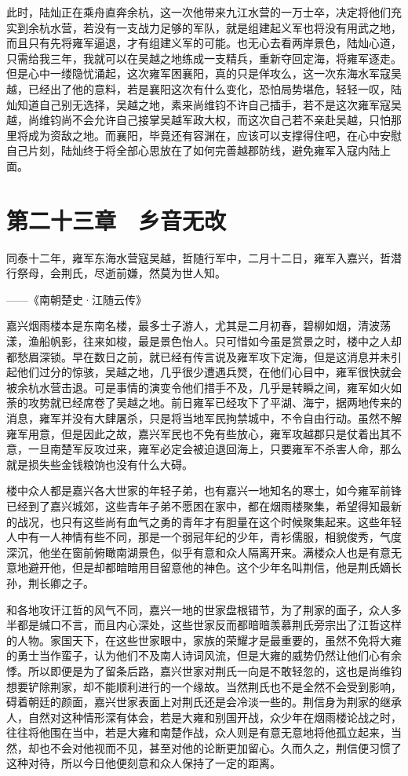 此时，陆灿正在乘舟直奔余杭，这一次他带来九江水营的一万士卒，决定将他们充实到余杭水营，若没有一支战力足够的军队，就是组建起义军也将没有用武之地，而且只有先将雍军逼退，才有组建义军的可能。也无心去看两岸景色，陆灿心道，只需给我三年，我就可以在吴越之地练成一支精兵，重新夺回定海，将雍军逐走。但是心中一缕隐忧涌起，这次雍军困襄阳，真的只是佯攻么，这一次东海水军寇吴越，已经出了他的意料，若是襄阳这次有什么变化，恐怕局势堪危，轻轻一叹，陆灿知道自己别无选择，吴越之地，素来尚维钧不许自己插手，若不是这次雍军寇吴越，尚维钧尚不会允许自己接掌吴越军政大权，而这次自己若不亲赴吴越，只怕那里将成为资敌之地。而襄阳，毕竟还有容渊在，应该可以支撑得住吧，在心中安慰自己片刻，陆灿终于将全部心思放在了如何完善越郡防线，避免雍军入寇内陆上面。

\chapter{第二十三章　乡音无改}

同泰十二年，雍军东海水营寇吴越，哲随行军中，二月十二日，雍军入嘉兴，哲潜行祭母，会荆氏，尽逝前嫌，然莫为世人知。

——《南朝楚史·江随云传》

嘉兴烟雨楼本是东南名楼，最多士子游人，尤其是二月初春，碧柳如烟，清波荡漾，渔船帆影，往来如梭，最是景色怡人。只可惜如今虽是赏景之时，楼中之人却都愁眉深锁。早在数日之前，就已经有传言说及雍军攻下定海，但是这消息并未引起他们过分的惊骇，吴越之地，几乎很少遭遇兵燹，在他们心目中，雍军很快就会被余杭水营击退。可是事情的演变令他们措手不及，几乎是转瞬之间，雍军如火如荼的攻势就已经席卷了吴越之地。前日雍军已经攻下了平湖、海宁，据两地传来的消息，雍军并没有大肆屠杀，只是将当地军民拘禁城中，不令自由行动。虽然不解雍军用意，但是因此之故，嘉兴军民也不免有些放心，雍军攻越郡只是仗着出其不意，一旦南楚军反攻过来，雍军必定会被迫退回海上，只要雍军不杀害人命，那么就是损失些金钱粮饷也没有什么大碍。

楼中众人都是嘉兴各大世家的年轻子弟，也有嘉兴一地知名的寒士，如今雍军前锋已经到了嘉兴城郊，这些青年子弟不愿困在家中，都在烟雨楼聚集，希望得知最新的战况，也只有这些尚有血气之勇的青年才有胆量在这个时候聚集起来。这些年轻人中有一人神情有些不同，那是一个弱冠年纪的少年，青衫儒服，相貌俊秀，气度深沉，他坐在窗前俯瞰南湖景色，似乎有意和众人隔离开来。满楼众人也是有意无意地避开他，但是却都暗暗用目留意他的神色。这个少年名叫荆信，他是荆氏嫡长孙，荆长卿之子。

和各地攻讦江哲的风气不同，嘉兴一地的世家盘根错节，为了荆家的面子，众人多半都是缄口不言，而且内心深处，这些世家反而都暗暗羡慕荆氏旁宗出了江哲这样的人物。家国天下，在这些世家眼中，家族的荣耀才是最重要的，虽然不免将大雍的勇士当作蛮子，认为他们不及南人诗词风流，但是大雍的威势仍然让他们心有余悸。所以即便是为了留条后路，嘉兴世家对荆氏一向是不敢轻忽的，这也是尚维钧想要铲除荆家，却不能顺利进行的一个缘故。当然荆氏也不是全然不会受到影响，碍着朝廷的颜面，嘉兴世家表面上对荆氏还是会冷淡一些的。荆信身为荆家的继承人，自然对这种情形深有体会，若是大雍和别国开战，众少年在烟雨楼论战之时，往往将他围在当中，若是大雍和南楚作战，众人则是有意无意地将他孤立起来，当然，却也不会对他视而不见，甚至对他的论断更加留心。久而久之，荆信便习惯了这种对待，所以今日他便刻意和众人保持了一定的距离。

